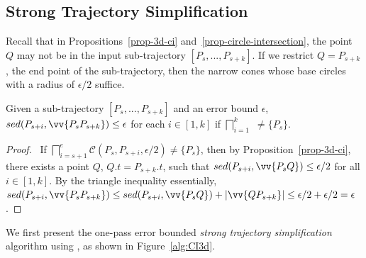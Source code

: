 \subsection{Strong Trajectory Simplification}




Recall that in Propositions~\ref{prop-3d-ci} and~\ref{prop-circle-intersection}, the point $Q$ may not be in the input sub-trajectory $[P_s,...,P_{s+k}]$.
If we restrict $Q=P_{s+k}$, the end point of the sub-trajectory, then the narrow cones whose base circles with a radius of $\epsilon/2$ suffice.

\begin{prop}
\label{prop-3d-ci-half}
Given a sub-trajectory $[P_s,...,P_{s+k}]$ and an error bound $\epsilon$, $sed(P_{s+i}, \vv{P_sP_{s+k}})\le \epsilon$ for each $i \in [1,k]$ if  $\bigsqcap_{i=1}^{k}$ $\ne \{P_s\}$.
\end{prop}


\begin{proof}\
If $\bigsqcap_{i=s+1}^{e}{\mathcal{C}(P_s, P_{s+i}, \epsilon/2)} \ne \{P_s\}$, then by Proposition~\ref{prop-3d-ci}, there exists a point $Q$, $Q.t = P_{s+k}.t$, such that $sed(P_{s+i}, \vv{P_sQ})\le \epsilon/2$ for all $i \in [1,k]$. By the triangle inequality essentially, $sed(P_{s+i}, \vv{P_sP_{s+k}})\le  sed(P_{s+i}, \vv{P_sQ}) + |\vv{QP_{s+k}}| \le  \epsilon/2+\epsilon/2 = \epsilon$. \eop
\end{proof}


 We first present the  one-pass error bounded {\em strong trajectory simplification} algorithm using \sed, as shown in Figure~\ref{alg:CI3d}.



